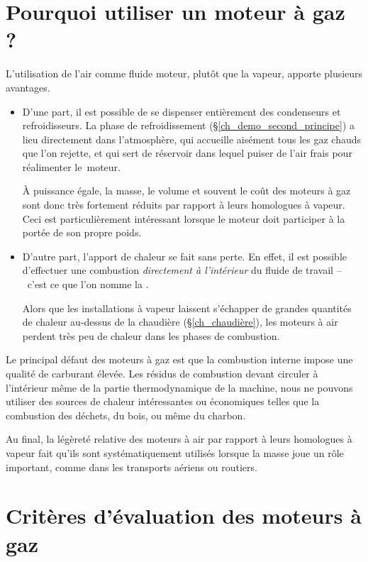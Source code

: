 \section{Pourquoi utiliser un moteur à gaz ?}

	L’utilisation de l’air comme fluide moteur, plutôt que la vapeur, apporte plusieurs avantages.

	\begin{itemize}
		\item D’une part, il est possible de se dispenser entièrement des condenseurs et refroidisseurs. La phase de refroidissement (\S\ref{ch_demo_second_principe}) a lieu directement dans l’atmosphère, qui accueille aisément tous les gaz chauds que l’on rejette, et qui sert de réservoir dans lequel puiser de l’air frais pour réalimenter le~moteur.

		À puissance égale, la masse, le volume et souvent le coût des moteurs à gaz sont donc très fortement réduits par rapport à leurs homologues à vapeur. Ceci est particulièrement intéressant lorsque le moteur doit participer à la portée de son propre poids.

		\item D’autre part, l’apport de chaleur se fait sans perte. En effet, il est possible d’effectuer une combustion \emph{directement à l’intérieur} du fluide de travail --\ c’est ce que l’on nomme la .

		Alors que les installations à vapeur laissent s’échapper de grandes quantités de chaleur au-dessus de la chaudière (\S\ref{ch_chaudière}), les moteurs à air perdent très peu de chaleur dans les phases de combustion.
	\end{itemize}

	Le principal défaut des moteurs à gaz est que la combustion interne impose une qualité de carburant élevée. Les résidus de combustion devant circuler à l’intérieur même de la partie thermodynamique de la machine, nous ne pouvons utiliser des sources de chaleur intéressantes ou économiques telles que la combustion des déchets, du bois, ou même du charbon.

	Au final, la légèreté relative des moteurs à air par rapport à leurs homologues à vapeur fait qu’ils sont systématiquement utilisés lorsque la masse joue un rôle important, comme dans les transports aériens ou routiers.



\section{Critères d’évaluation des moteurs à gaz}
\label{ch_criteres_evaluation_moteurs_gaz}

